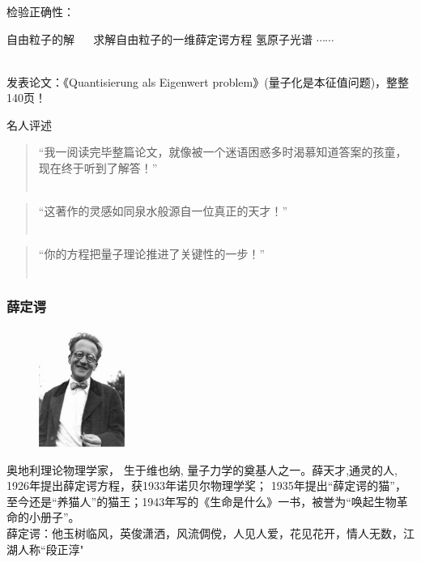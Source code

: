 \begin{frame}
    \frametitle{}
    检验正确性：
    \begin{enumerate}
        \Item 自由粒子的解 ~~ 求解自由粒子的一维薛定谔方程
        \Item 氢原子光谱
        \Item $\cdots \cdots$
    \end{enumerate}
    ~\\ 
    发表论文：《Quantisierung als Eigenwert problem》(量子化是本征值问题)，整整140页！
\end{frame}

\begin{frame}{名人评述}
    \begin{enumerate}
        \Item 
        \begin{quote}
            “我一阅读完毕整篇论文，就像被一个迷语困惑多时渴慕知道答案的孩童，现在终于听到了解答！” \\
            ~~\\
        \end{quote}  
        \Item 
        \begin{quote}
            “这著作的灵感如同泉水般源自一位真正的天才！” \\
            ~~\\
        \end{quote}  
        \Item  
        \begin{quote}
            “你的方程把量子理论推进了关键性的一步！” \\
            ~~\\
        \end{quote} 
    \end{enumerate}
\end{frame}

\begin{frame}
    \frametitle{薛定谔}
    \begin{figure} %
        \includegraphics[width=0.25\textwidth]{figs/schroginger.png}   
    \end{figure}
奥地利理论物理学家， 生于维也纳, 量子力学的奠基人之一。薛天才,通灵的人, 1926年提出薛定谔方程，获1933年诺贝尔物理学奖； 1935年提出“薛定谔的猫”，至今还是“养猫人”的猫王；1943年写的《生命是什么》一书，被誉为“唤起生物革命的小册子”。\\ \vspace{0.3em}
薛定谔：他玉树临风，英俊潇洒，风流倜傥，人见人爱，花见花开，情人无数，江湖人称“段正淳"
\end{frame}

